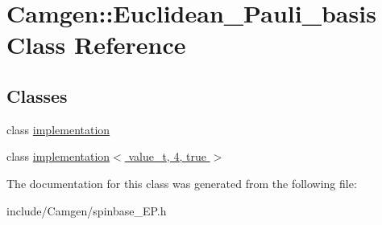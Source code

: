 \hypertarget{a00136}{\section{Camgen\-:\-:Euclidean\-\_\-\-Pauli\-\_\-basis Class Reference}
\label{a00136}
}
\subsection*{Classes}
\begin{DoxyCompactItemize}
\item 
class \hyperlink{a00283}{implementation}
\item 
class \hyperlink{a00298}{implementation$<$ value\-\_\-t, 4, true $>$}
\end{DoxyCompactItemize}


The documentation for this class was generated from the following file\-:\begin{DoxyCompactItemize}
\item 
include/\-Camgen/spinbase\-\_\-\-E\-P.\-h\end{DoxyCompactItemize}
